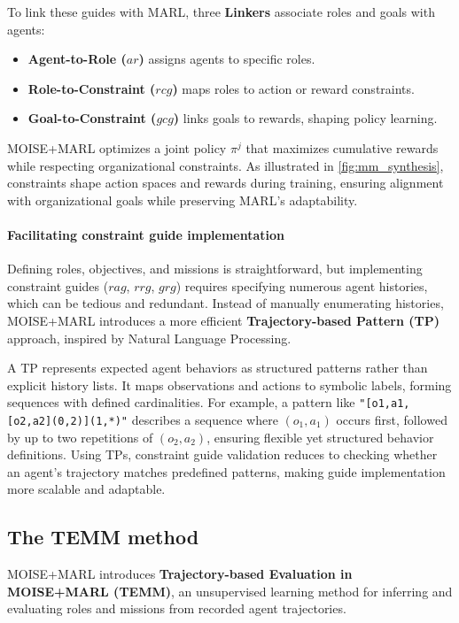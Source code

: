 \documentclass[pdflatex,sn-mathphys-num]{sn-jnl}%
\theoremstyle{thmstyleone}%
\theoremstyle{thmstyletwo}%
\theoremstyle{thmstylethree}%
\begin{document}
To link these guides with MARL, three \textbf{Linkers} associate roles and goals with agents:
\begin{itemize}
    \item \textbf{Agent-to-Role ($ar$)} assigns agents to specific roles.
    \item \textbf{Role-to-Constraint ($rcg$)} maps roles to action or reward constraints.
    \item \textbf{Goal-to-Constraint ($gcg$)} links goals to rewards, shaping policy learning.
\end{itemize}

MOISE+MARL optimizes a joint policy $\pi^{j}$ that maximizes cumulative rewards while respecting organizational constraints. As illustrated in \autoref{fig:mm_synthesis}, constraints shape action spaces and rewards during training, ensuring alignment with organizational goals while preserving MARL's adaptability.

\paragraph{Facilitating constraint guide implementation}

Defining roles, objectives, and missions is straightforward, but implementing constraint guides ($rag$, $rrg$, $grg$) requires specifying numerous agent histories, which can be tedious and redundant. Instead of manually enumerating histories, MOISE+MARL introduces a more efficient \textbf{Trajectory-based Pattern (TP)} approach, inspired by Natural Language Processing.

A TP represents expected agent behaviors as structured patterns rather than explicit history lists. It maps observations and actions to symbolic labels, forming sequences with defined cardinalities. For example, a pattern like \texttt{"[o1,a1,[o2,a2](0,2)](1,*)"} describes a sequence where $(o_1, a_1)$ occurs first, followed by up to two repetitions of $(o_2, a_2)$, ensuring flexible yet structured behavior definitions.
Using TPs, constraint guide validation reduces to checking whether an agent's trajectory matches predefined patterns, making guide implementation more scalable and adaptable.


\subsection{The TEMM method}

MOISE+MARL introduces \textbf{Trajectory-based Evaluation in MOISE+MARL (TEMM)}, an unsupervised learning method for inferring and evaluating roles and missions from recorded agent trajectories.
\end{document}
